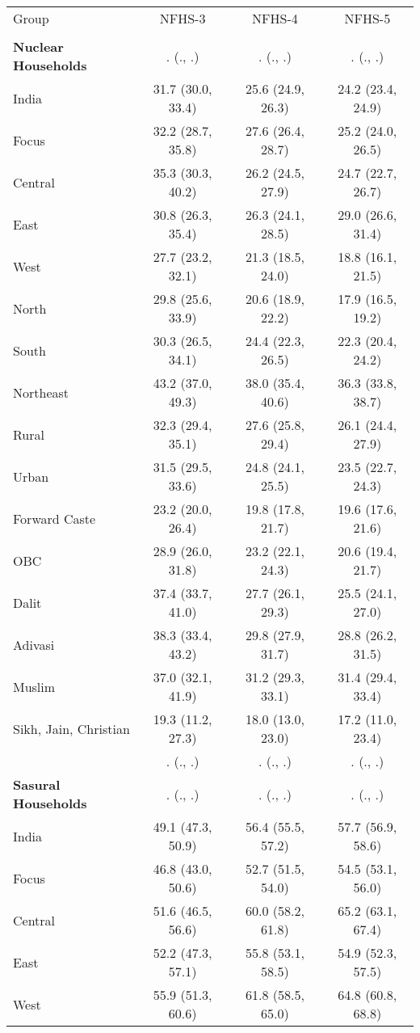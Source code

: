 \begin{tabular}{lccc}
\toprule
Group & NFHS-3 & NFHS-4 & NFHS-5 \\\\
\midrule
\textbf{Nuclear Households}&. (., .)&. (., .)&. (., .)\\
India&31.7 (30.0, 33.4)&25.6 (24.9, 26.3)&24.2 (23.4, 24.9)\\
Focus&32.2 (28.7, 35.8)&27.6 (26.4, 28.7)&25.2 (24.0, 26.5)\\
Central&35.3 (30.3, 40.2)&26.2 (24.5, 27.9)&24.7 (22.7, 26.7)\\
East&30.8 (26.3, 35.4)&26.3 (24.1, 28.5)&29.0 (26.6, 31.4)\\
West&27.7 (23.2, 32.1)&21.3 (18.5, 24.0)&18.8 (16.1, 21.5)\\
North&29.8 (25.6, 33.9)&20.6 (18.9, 22.2)&17.9 (16.5, 19.2)\\
South&30.3 (26.5, 34.1)&24.4 (22.3, 26.5)&22.3 (20.4, 24.2)\\
Northeast&43.2 (37.0, 49.3)&38.0 (35.4, 40.6)&36.3 (33.8, 38.7)\\
Rural&32.3 (29.4, 35.1)&27.6 (25.8, 29.4)&26.1 (24.4, 27.9)\\
Urban&31.5 (29.5, 33.6)&24.8 (24.1, 25.5)&23.5 (22.7, 24.3)\\
Forward Caste&23.2 (20.0, 26.4)&19.8 (17.8, 21.7)&19.6 (17.6, 21.6)\\
OBC&28.9 (26.0, 31.8)&23.2 (22.1, 24.3)&20.6 (19.4, 21.7)\\
Dalit&37.4 (33.7, 41.0)&27.7 (26.1, 29.3)&25.5 (24.1, 27.0)\\
Adivasi&38.3 (33.4, 43.2)&29.8 (27.9, 31.7)&28.8 (26.2, 31.5)\\
Muslim&37.0 (32.1, 41.9)&31.2 (29.3, 33.1)&31.4 (29.4, 33.4)\\
Sikh, Jain, Christian&19.3 (11.2, 27.3)&18.0 (13.0, 23.0)&17.2 (11.0, 23.4)\\
&. (., .)&. (., .)&. (., .)\\
\textbf{Sasural Households}&. (., .)&. (., .)&. (., .)\\
India&49.1 (47.3, 50.9)&56.4 (55.5, 57.2)&57.7 (56.9, 58.6)\\
Focus&46.8 (43.0, 50.6)&52.7 (51.5, 54.0)&54.5 (53.1, 56.0)\\
Central&51.6 (46.5, 56.6)&60.0 (58.2, 61.8)&65.2 (63.1, 67.4)\\
East&52.2 (47.3, 57.1)&55.8 (53.1, 58.5)&54.9 (52.3, 57.5)\\
West&55.9 (51.3, 60.6)&61.8 (58.5, 65.0)&64.8 (60.8, 68.8)\\

\end{tabular}
